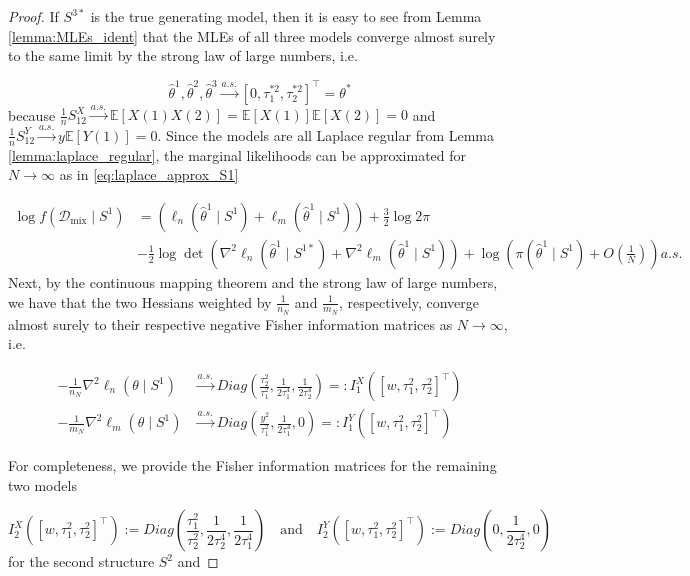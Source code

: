 \documentclass[accepted]{uai2026} %
\newcommand{\train}{\mathcal{D}}
\newcommand{\mixdata}{\train_{\text{mix}}}
\newcommand{\tsone}{\tau_1^{*2}}
\newcommand{\tstwo}{\tau_2^{*2}}
\def\transpose{\intercal}
\theoremstyle{boldremark}
\begin{document}
\begin{proof}
    If $S^{3*}$ is the true generating model, then it is easy to see from Lemma \ref{lemma:MLEs_ident} that the MLEs of all three models converge almost surely to the same limit by the strong law of large numbers, i.e.

    $$\hat{\theta}^1, \hat{\theta}^2, \hat{\theta}^3 \xrightarrow{a.s.} [0, \tsone, \tstwo]^\transpose = \theta^*$$
    because $\frac{1}{n}S_{12}^X \xrightarrow{a.s.} \mathbb{E}[X(1)X(2)] = \mathbb{E}[X(1)]\mathbb{E}[X(2)] = 0 $ and $\frac{1}{n}S_{12}^Y \xrightarrow{a.s.} y\mathbb{E}[Y(1)] = 0$. Since the models are all Laplace regular from Lemma \ref{lemma:laplace_regular}, the marginal likelihoods can be approximated for $N\to \infty$ as in \eqref{eq:laplace_approx_S1}
    
    \begin{align*}
    \log f(\mixdata \mid S^{1}) &= \left( \ell_n(\hat{\theta}^1 \mid S^{1}) + \ell_m(\hat{\theta}^1 \mid S^{1}) \right) + \frac{3}{2}\log 2\pi \\
    & -\frac{1}{2} \log \det\left( \nabla^2 \ell_n(\hat{\theta}^1 \mid S^{1*}) + \nabla^2 \ell_m(\hat{\theta}^1 \mid S^{1}) \right) + \log\left( \pi(\hat{\theta}^1 \mid S^{1}) + O\left(\frac{1}{N}\right) \right) a.s.
\end{align*}
    Next, by the continuous mapping theorem and the strong law of large numbers, we have that the two Hessians weighted by $\frac{1}{n_N}$ and $\frac{1}{m_N}$, respectively, converge almost surely to their respective negative Fisher information matrices as $N \to \infty$, i.e.

    \begin{align*}
        -\frac{1}{n_N}\nabla^2 \ell_n(\theta\mid  S^1) &\xrightarrow{a.s.} Diag\left(\frac{\tau_2^2}{\tau_1^2}, \frac{1}{2\tau_1^4}, \frac{1}{2\tau_2^4}\right) =: I^X_1([w, \tau_1^2, \tau_2^2]^\transpose)\\
        -\frac{1}{m_N}\nabla^2 \ell_m(\theta\mid S^1) &\xrightarrow{a.s.} Diag\left(\frac{y^2}{\tau_1^2}, \frac{1}{2\tau_1^4}, 0\right) =: I^Y_1([w, \tau_1^2, \tau_2^2]^\transpose)
    \end{align*}
    
    For completeness, we provide the Fisher information matrices for the remaining two models

    $$I_2^X([w, \tau_1^2, \tau_2^2]^\transpose) := Diag\left( \frac{\tau_1^2}{\tau_2^2}, \frac{1}{2\tau_2^4}, \frac{1}{2\tau_1^4}\right)\quad \text{and}\quad I_2^Y([w, \tau_1^2, \tau_2^2]^\transpose):= Diag\left(0,\frac{1}{2\tau_2^4}, 0\right)$$
    for the second structure $S^2$ and


\end{proof}
\end{document}

